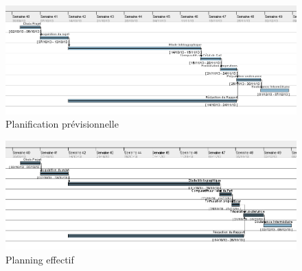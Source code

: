 \documentclass[11pt, french,screen]{report-rd-info}
\begin{document}
\begin{figure}
	\centering
		\includegraphics[width=1\textwidth]{Gantts/p1_previsionnel}
	\caption{Planification prévisionnelle}
	\label{fig:PlanningPrevisionnel}
\end{figure}
\begin{figure}
	\centering
		\includegraphics[width=1\textwidth]{Gantts/p1_effectif}
	\caption{Planning effectif}
	\label{fig:PlanningEffectif}
\end{figure}
\end{document}

